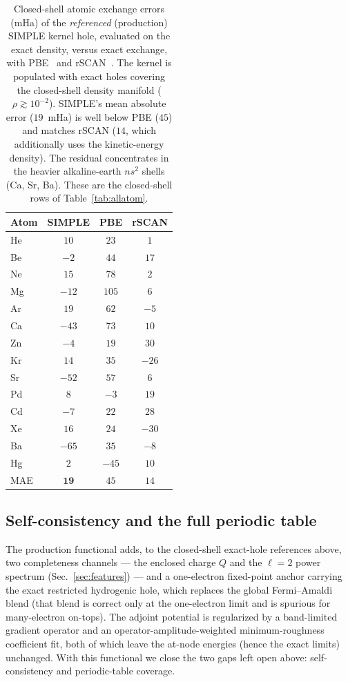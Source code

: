 \documentclass[aps,prb,reprint,superscriptaddress,nofootinbib]{revtex4-2}
\begin{document}
\begin{table}[tb]
\centering
\caption{Closed-shell atomic exchange errors (mHa) of the \emph{referenced} (production) SIMPLE
kernel hole, evaluated on the exact density, versus exact exchange, with PBE~\cite{Perdew_1996} and
rSCAN~\cite{Bart_k_2019}. The kernel is populated with exact holes covering the closed-shell density
manifold ($\rho\gtrsim10^{-2}$). SIMPLE's mean absolute error ($19$~mHa) is well below PBE ($45$) and
matches rSCAN ($14$, which additionally uses the kinetic-energy density). The residual concentrates in
the heavier alkaline-earth $ns^2$ shells (Ca, Sr, Ba). These are the closed-shell rows of
Table~\ref{tab:allatom}.}
\label{tab:ref-energies}
\begin{tabular}{lccc}
\toprule
Atom & SIMPLE & PBE & rSCAN \\
\midrule
He & $10$  & $23$  & $1$   \\
Be & $-2$  & $44$  & $17$  \\
Ne & $15$  & $78$  & $2$   \\
Mg & $-12$ & $105$ & $6$   \\
Ar & $19$  & $62$  & $-5$  \\
Ca & $-43$ & $73$  & $10$  \\
Zn & $-4$  & $19$  & $30$  \\
Kr & $14$  & $35$  & $-26$ \\
Sr & $-52$ & $57$  & $6$   \\
Pd & $8$   & $-3$  & $19$  \\
Cd & $-7$  & $22$  & $28$  \\
Xe & $16$  & $24$  & $-30$ \\
Ba & $-65$ & $35$  & $-8$  \\
Hg & $2$   & $-45$ & $10$  \\
\midrule
MAE & $\mathbf{19}$ & $45$ & $14$ \\
\bottomrule
\end{tabular}
\end{table}

\subsection{Self-consistency and the full periodic table}
\label{sec:results-allatom}

The production functional adds, to the closed-shell exact-hole references above, two completeness
channels --- the enclosed charge $Q$ and the $\ell=2$ power spectrum (Sec.~\ref{sec:features}) --- and a
one-electron fixed-point anchor carrying the exact restricted hydrogenic hole, which replaces the global
Fermi--Amaldi blend (that blend is correct only at the one-electron limit and is spurious for
many-electron on-tops). The adjoint potential is regularized by a band-limited gradient operator and an
operator-amplitude-weighted minimum-roughness coefficient fit, both of which leave the at-node energies
(hence the exact limits) unchanged. With this functional we close the two gaps left open above:
self-consistency and periodic-table coverage.
\end{document}
